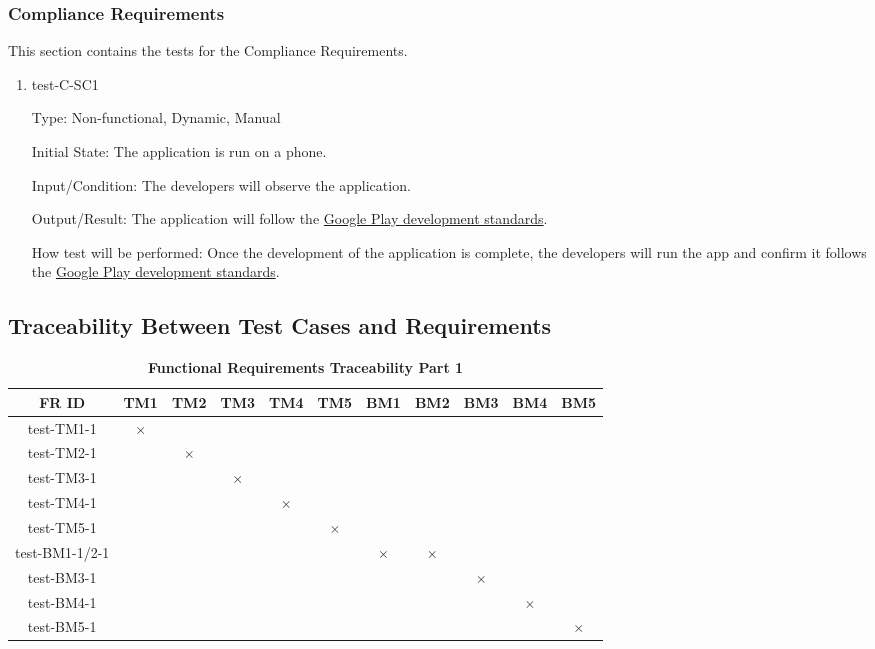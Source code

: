 \documentclass[12pt, titlepage]{article}
\begin{document}
\subsubsection{Compliance Requirements}

This section contains the tests for the Compliance Requirements.
		
\begin{enumerate}

\item{test-C-SC1\\}

Type: Non-functional, Dynamic, Manual 
					
Initial State: The application is run on a phone.
					
Input/Condition: The developers will observe the application.
					
Output/Result: The application will follow the \href{https://play.google.com/about/developer-content-policy/}{Google Play development standards}.
					
How test will be performed: Once the development of the application is complete, the developers will run the app and confirm it follows the \href{https://play.google.com/about/developer-content-policy/}{Google Play development standards}.

\end{enumerate}

\subsection{Traceability Between Test Cases and Requirements}


\begin{table}[H]
\centering
\begin{tabular}{|c|c|c|c|c|c|c|c|c|c|c|}
\hline
FR ID & TM1 & TM2 & TM3 & TM4 & TM5 & BM1 & BM2 & BM3 & BM4 & BM5 \\
\hline 
test-TM1-1 & $\times$ & & & & & & & & & \\
test-TM2-1 & & $\times$ & & & & & & & & \\
test-TM3-1 & & & $\times$ & & & & & & & \\
test-TM4-1 & & & & $\times$ & & & & & & \\
test-TM5-1 & & & & & $\times$ & & & & & \\
test-BM1-1/2-1 & & & & & & $\times$ & $\times$ & & & \\
test-BM3-1 & & & & & & & & $\times$ & & \\
test-BM4-1 & & & & & & & & & $\times$ & \\
test-BM5-1 & & & & & & & & & & $\times$ \\

\hline
\end{tabular}
\caption{\bf Functional Requirements Traceability Part 1}
\end{table}
\end{document}
